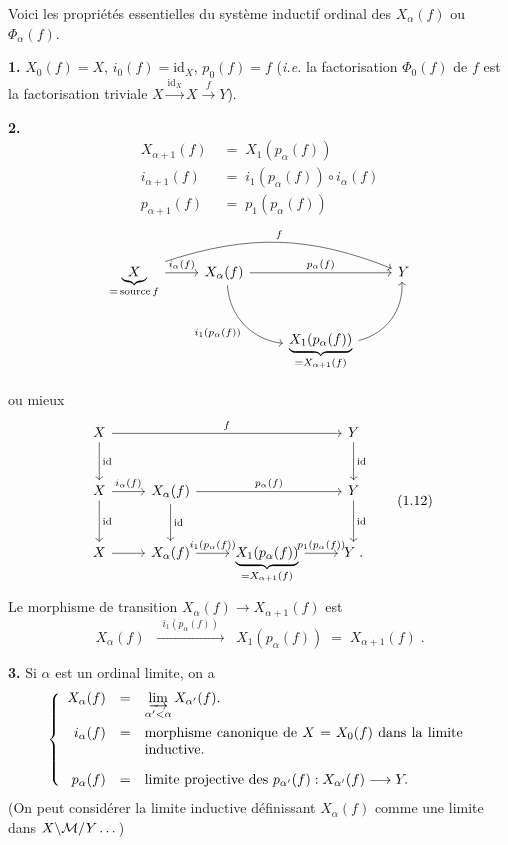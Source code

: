 Voici les propriétés essentielles du système inductif ordinal des $X_\alpha(f)$ ou $\Phi_\alpha(f)$.


\textbf{1.} $X_0(f) = X$, $i_0(f) = \mathrm{id}_X$, $p_0(f) = f$ (\textit{i.e.} la factorisation $\Phi_0(f)$ de $f$ est la factorisation triviale $X \xrightarrow{\mathrm{id}_X} X \xrightarrow{f} Y$).

\textbf{2.}
\[
\begin{aligned}
X_{\alpha+1}(f) &\;=\; X_1(p_\alpha(f)) \\
i_{\alpha+1}(f) &\;=\; i_1(p_\alpha(f)) \circ i_\alpha(f) \\
p_{\alpha+1}(f) &\;=\; p_1(p_\alpha(f))
\end{aligned}
\]
\[
\begin{tikzcd}
\underbrace{X}_{= \,\mathrm{source}\, f} \arrow[r, "i_\alpha(f)"] \arrow[rrr, bend left=20, "f"] & X_\alpha(f) \arrow[rr, "p_\alpha(f)"] \arrow[dr, bend right=40, "i_1(p_\alpha(f))"'] & & Y \\
& & \underbrace{X_1(p_\alpha(f))}_{= X_{\alpha+1}(f)} \arrow[ur, bend right=40] &
\end{tikzcd}
\]

\clearpage


ou mieux
\[
\begin{tikzcd}[row sep=large]
X \arrow[rrr, "f"] \arrow[d, "\mathrm{id}"] & & & Y \arrow[d, "\mathrm{id}"] \\
X \arrow[r, "i_\alpha(f)"] \arrow[d, "\mathrm{id}"] & X_\alpha(f) \arrow[rr, "p_\alpha(f)"] \arrow[d, "\mathrm{id}"] & & Y \arrow[d, "\mathrm{id}"] \\
X \arrow[r] & X_\alpha(f) \arrow[r, "i_1(p_\alpha(f))"] & \underbrace{X_1(p_\alpha(f))}_{= X_{\alpha+1}(f)} \arrow[r, "p_1(p_\alpha(f))"] & Y \;.
\end{tikzcd}
\tag*{(1.12)}
\]
Le morphisme de transition $X_\alpha(f) \longrightarrow X_{\alpha+1}(f)$ est
\[
X_\alpha(f) \;\; \xrightarrow{\;\;i_1(p_\alpha(f))\;\;} \;\; X_1(p_\alpha(f)) \;=\; X_{\alpha+1}(f) \;.
\]

\textbf{3.} Si $\alpha$ est un ordinal limite, on a
\[
\left\{
\begin{array}{rcl}
X_\alpha(f) & = & \varinjlim\limits_{\alpha'<\alpha} X_{\alpha'}(f). \\[3ex]
i_\alpha(f) & = & \parbox[t]{8cm}{morphisme canonique de $X = X_0(f)$ dans la limite inductive.} \\[5ex]
p_\alpha(f) & = & \text{limite projective des } p_{\alpha'}(f) : X_{\alpha'}(f) \longrightarrow Y.
\end{array}
\right.
\]
(On peut considérer la limite inductive définissant $X_\alpha(f)$ comme une limite dans $X\backslash\mathcal{M}/Y\dots$)

